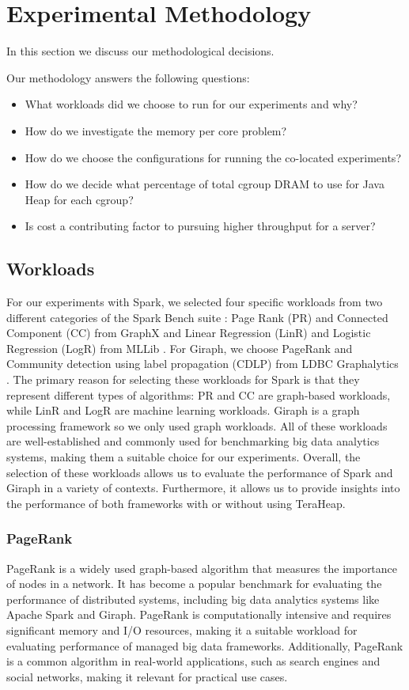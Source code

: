 \section{Experimental Methodology}
\label{sec:method}

In this section we discuss our methodological decisions.

Our methodology answers the following questions:
\begin{itemize}
	\item{What workloads did we choose to run for our experiments and why?}
	\item{How do we investigate the memory per core problem?}
	\item{How do we choose the configurations for running the co-located experiments?}
	\item{How do we decide what percentage of total cgroup DRAM to use for Java Heap for each cgroup?}
	\item{Is cost a contributing factor to pursuing higher throughput for a server?}
\end{itemize}

\subsection{Workloads}
For our experiments with Spark, we selected four specific workloads from two
different categories of the Spark Bench suite \cite{Spark-Bench}: Page Rank (PR) and Connected
Component (CC) from GraphX \cite{GraphX} and Linear Regression (LinR) and Logistic Regression (LogR)
from MLLib \cite{MLLib}. For Giraph, we choose PageRank and Community detection 
using label propagation (CDLP) from LDBC Graphalytics \cite{ldbc}. The primary reason for selecting these workloads for Spark is that
they represent different types of algorithms: PR and CC are graph-based workloads, while LinR and LogR are machine learning
workloads. Giraph is a graph processing framework so we only used graph workloads. All of these
workloads are well-established and commonly used for benchmarking big
data analytics systems, making them a suitable choice for our
experiments. Overall, the selection of these workloads allows us to
evaluate the performance of Spark and Giraph in a variety of contexts. Furthermore, it allows us to
provide insights into the performance of both frameworks with or without using TeraHeap.


\subsubsection{PageRank}
PageRank is a widely used graph-based algorithm that measures the
importance of nodes in a network. It has become a popular benchmark
for evaluating the performance of distributed systems, including big
data analytics systems like Apache Spark and Giraph. PageRank is computationally
intensive and requires significant memory and I/O resources, making it
a suitable workload for evaluating performance of managed big data frameworks. Additionally, PageRank is a
common algorithm in real-world applications, such as search engines
and social networks, making it relevant for practical use cases.

